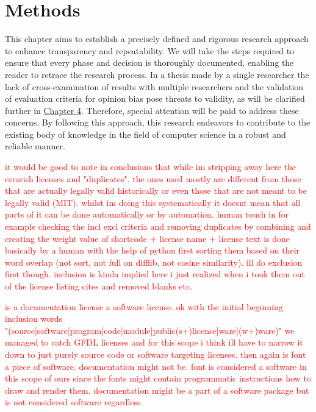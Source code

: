 \chapter{Methods\label{methods}}
This chapter aims to establish a precisely defined and rigorous research approach to enhance transparency and repeatability. We will take the steps required to ensure that every phase and decision is thoroughly documented, enabling the reader to retrace the research process. In a thesis made by a single researcher the lack of cross-examination of results with multiple researchers and the validation of evaluation criteria for opinion bias pose threats to validity, as will be clarified further in \hyperref[discussion]{Chapter 4}. Therefore, special attention will be paid to address these concerns. By following this approach, this research endeavors to contribute to the existing body of knowledge in the field of computer science in a robust and reliable manner.

\textcolor{red}{it would be good to note in conclusions that while im stripping away here the errorish licenses and "duplicates". the ones used mostly are different from those that are actually legally valid historically or even those that are not meant to be legally valid (MIT). whilst im doing this systematically it doesnt mean that all parts of it can be done automatically or by automation. human touch in for example checking the incl excl criteria and removing duplicates by combining and creating the weight value of shortcode + license name + license text is done basically by a human with the help of python first sorting them based on their word overlap (not sort, not full on difflib, not cosine similarity). ill do exclusion first though. inclusion is kinda implied here i just realized when i took them out of the license listing cites and removed blanks etc.}

\textcolor{red}{is a documentation license a software license. ok with the initial beginning inclusion words \\"(source|software|program|code|module|public(s+)license|ware|(w+)ware)" we managed to catch GFDL licenses and for this scope i think ill have to narrow it down to just purely source code or software targeting licenses. then again is font a piece of software. documentation might not be. font is considered a software in this scope of ours since the fonts might contain programmatic instructions how to draw and render them. documentation might be a part of a software package but is not considered software regardless.}

